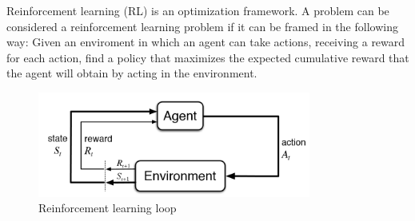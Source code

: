 \documentclass{../main.tex}{subfiles}
\begin{document}
Reinforcement learning (RL) is an optimization framework. A problem can be considered a reinforcement learning problem if it can be framed in the following way: Given an enviroment in which an agent can take actions, receiving a reward for each action, find a policy that maximizes the expected cumulative reward that the agent will obtain by acting in the environment.

\begin{figure}[h]
    \centering
    \includegraphics[width=0.8\textwidth]{images/rl-loop}
    \caption{Reinforcement learning loop}
    \label{fig:rl-loop}
\end{figure}
\end{document}
